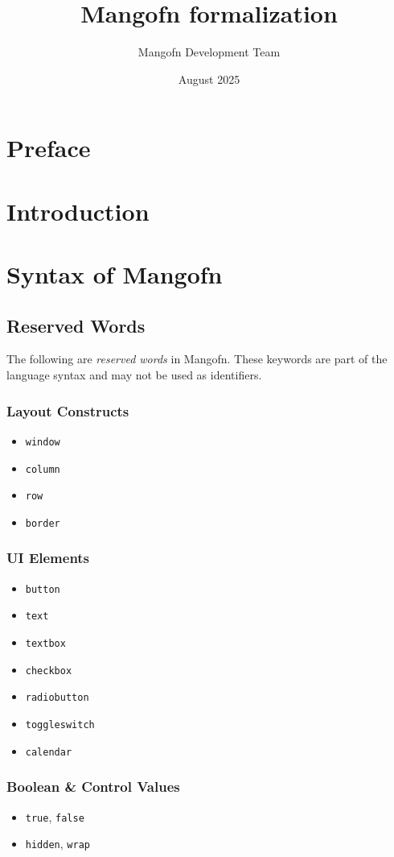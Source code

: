 \documentclass{article}
\title{Mangofn formalization}
\author{Mangofn Development Team}
\date{August 2025}
\begin{document}
\maketitle

\section{Preface}
\section{Introduction}
\section{Syntax of Mangofn}
\subsection{Reserved Words}
The following are \textit{reserved words} in Mangofn. These keywords are part of the language syntax and may not be used as identifiers.

\subsubsection*{Layout Constructs}
\begin{itemize}
    \item \texttt{window}
    \item \texttt{column}
    \item \texttt{row}
    \item \texttt{border}
\end{itemize}

\subsubsection*{UI Elements}
\begin{itemize}
    \item \texttt{button}
    \item \texttt{text}
    \item \texttt{textbox}
    \item \texttt{checkbox}
    \item \texttt{radiobutton}
    \item \texttt{toggleswitch}
    \item \texttt{calendar}
\end{itemize}

\subsubsection*{Boolean \& Control Values}
\begin{itemize}
    \item \texttt{true}, \texttt{false}
    \item \texttt{hidden}, \texttt{wrap}
\end{itemize}
\end{document}
